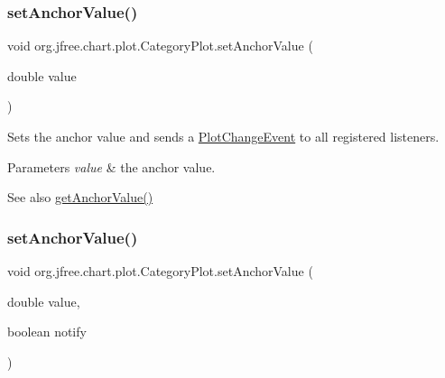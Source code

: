 \mbox{\label{classorg_1_1jfree_1_1chart_1_1plot_1_1_category_plot_a38b54324604b152b74491a08b2661257}} 
\subsubsection{\texorpdfstring{set\+Anchor\+Value()}{setAnchorValue()}\hspace{0.1cm}{\footnotesize\ttfamily [1/2]}}
{\footnotesize\ttfamily void org.\+jfree.\+chart.\+plot.\+Category\+Plot.\+set\+Anchor\+Value (\begin{DoxyParamCaption}\item[{double}]{value }\end{DoxyParamCaption})}

Sets the anchor value and sends a \mbox{\hyperlink{}{Plot\+Change\+Event}} to all registered listeners.


\begin{DoxyParams}{Parameters}
{\em value} & the anchor value.\\
\hline
\end{DoxyParams}
\begin{DoxySeeAlso}{See also}
\mbox{\hyperlink{classorg_1_1jfree_1_1chart_1_1plot_1_1_category_plot_a7436b0bcbd290c89709539ad0e7c91be}{get\+Anchor\+Value()}} 
\end{DoxySeeAlso}
\mbox{\label{classorg_1_1jfree_1_1chart_1_1plot_1_1_category_plot_a328492a0204cef0951139c4026d20d63}} 
\subsubsection{\texorpdfstring{set\+Anchor\+Value()}{setAnchorValue()}\hspace{0.1cm}{\footnotesize\ttfamily [2/2]}}
{\footnotesize\ttfamily void org.\+jfree.\+chart.\+plot.\+Category\+Plot.\+set\+Anchor\+Value (\begin{DoxyParamCaption}\item[{double}]{value,  }\item[{boolean}]{notify }\end{DoxyParamCaption})}

